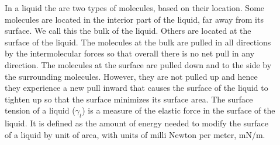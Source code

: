 \documentclass[main.tex]{subfiles}
\newcommand\chapterlabel{solids}
\begin{document}
\begin{description}
\item[] In a liquid the are two types of molecules, based on their location. Some molecules are located in the interior part of the liquid, far away from its surface. We call this the bulk of the liquid. Others are located at the surface of the liquid. The molecules at the bulk are pulled in all directions by the intermolecular forces so that overall there is no net pull in any direction. The molecules at the surface are pulled down and to the side by the surrounding molecules. However, they are not pulled up and hence they experience a new pull inward that causes the surface of the liquid to tighten up so that the surface minimizes its surface area. The surface tension of a liquid ($\gamma_t$) is a measure of the elastic force in the surface of the liquid. It is defined as the amount of energy needed to modify the surface of a liquid by unit of area, with units of milli Newton per meter, mN/m.
\vspace{-0cm}
     \label{Fig:{\chapterlabel}\thefigurenewcounter}
     \begin{center}
     
     
\end{center}
\end{description}
\end{document}
